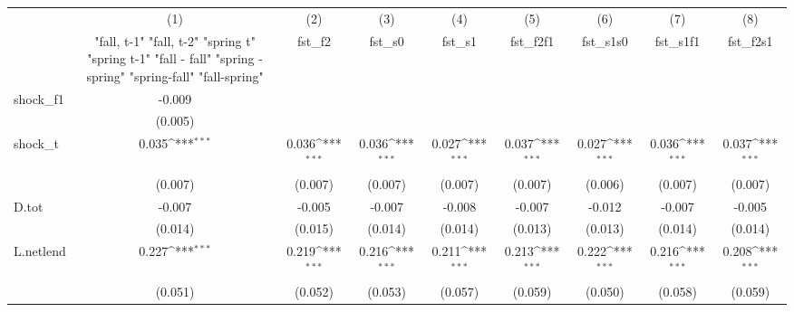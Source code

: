 {
\def\sym#1{\ifmmode^{#1}\else\(^{#1}\)\fi}
\begin{tabular}{l*{8}{c}}
\toprule
            &\multicolumn{1}{c}{(1)}&\multicolumn{1}{c}{(2)}&\multicolumn{1}{c}{(3)}&\multicolumn{1}{c}{(4)}&\multicolumn{1}{c}{(5)}&\multicolumn{1}{c}{(6)}&\multicolumn{1}{c}{(7)}&\multicolumn{1}{c}{(8)}\\
            &\multicolumn{1}{c}{  "fall, t-1" "fall, t-2" "spring t" "spring t-1"  "fall - fall" "spring - spring" "spring-fall" "fall-spring" }&\multicolumn{1}{c}{fst\_f2}&\multicolumn{1}{c}{fst\_s0}&\multicolumn{1}{c}{fst\_s1}&\multicolumn{1}{c}{fst\_f2f1}&\multicolumn{1}{c}{fst\_s1s0}&\multicolumn{1}{c}{fst\_s1f1}&\multicolumn{1}{c}{fst\_f2s1}\\
\midrule
shock\_f1    &      -0.009         &                     &                     &                     &                     &                     &                     &                     \\
            &     (0.005)         &                     &                     &                     &                     &                     &                     &                     \\
\addlinespace
shock\_t     &       0.035\sym{***}&       0.036\sym{***}&       0.036\sym{***}&       0.027\sym{***}&       0.037\sym{***}&       0.027\sym{***}&       0.036\sym{***}&       0.037\sym{***}\\
            &     (0.007)         &     (0.007)         &     (0.007)         &     (0.007)         &     (0.007)         &     (0.006)         &     (0.007)         &     (0.007)         \\
\addlinespace
D.tot       &      -0.007         &      -0.005         &      -0.007         &      -0.008         &      -0.007         &      -0.012         &      -0.007         &      -0.005         \\
            &     (0.014)         &     (0.015)         &     (0.014)         &     (0.014)         &     (0.013)         &     (0.013)         &     (0.014)         &     (0.014)         \\
\addlinespace
L.netlend   &       0.227\sym{***}&       0.219\sym{***}&       0.216\sym{***}&       0.211\sym{***}&       0.213\sym{***}&       0.222\sym{***}&       0.216\sym{***}&       0.208\sym{***}\\
            &     (0.051)         &     (0.052)         &     (0.053)         &     (0.057)         &     (0.059)         &     (0.050)         &     (0.058)         &     (0.059)         \\

\end{tabular}}
